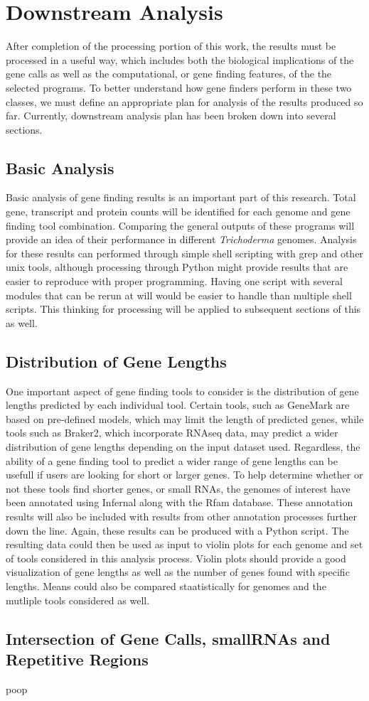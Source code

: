 \documentclass[12pt]{article}
\begin{document}
\section{Downstream Analysis}

After completion of the processing portion of this work, the results
must be processed in a useful way, which includes both the biological
implications of the gene calls as well as the computational, or gene
finding features, of the the selected programs. To better understand
how gene finders perform in these two classes, we must define an
appropriate plan for analysis of the results produced so
far. Currently, downstream analysis plan has been broken down into
several sections.

\subsection{Basic Analysis}

Basic analysis of gene finding results is an important part of this
research. Total gene, transcript and protein counts will be identified
for each genome and gene finding tool combination. Comparing the
general outputs of these programs will provide an idea of their
performance in different \textit{Trichoderma} genomes. Analysis for
these results can performed through simple shell scripting with grep
and other unix tools, although processing through Python might provide
results that are easier to reproduce with proper programming. Having
one script with several modules that can be rerun at will would be
easier to handle than multiple shell scripts. This thinking for
processing will be applied to subsequent sections of this as well. 

\subsection{Distribution of Gene Lengths}

One important aspect of gene finding tools to consider is the
distribution of gene lengths predicted by each individual
tool. Certain tools, such as GeneMark are based on pre-defined models,
which may limit the length of predicted genes, while tools such as
Braker2, which incorporate RNAseq data, may predict a wider
distribution of gene lengths depending on the input dataset
used. Regardless, the ability of a gene finding tool to predict a
wider range of gene lengths can be usefull if users are looking for
short or larger genes. To help determine whether or not these tools
find shorter genes, or small RNAs, the genomes of interest have been
annotated using Infernal along with the Rfam database. These
annotation results will also be included with results from other
annotation processes further down the line. Again, these results can
be produced with a Python script. The resulting data could then be
used as input to violin plots for each genome and set of tools
considered in this analysis process. Violin plots should provide a
good visualization of gene lengths as well as the number of genes
found with specific lengths. Means could also be compared
staatistically for genomes and the mutliple tools considered as well.

\subsection{Intersection of Gene Calls, smallRNAs and Repetitive Regions}

poop
\end{document}
